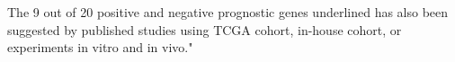 \documentclass[preprint,12pt]{elsarticle}
\newenvironment{MyColorPar}[1]{%
    \leavevmode\color{#1}\ignorespaces%
}{%
}%
\begin{document}
\begin{MyColorPar}{blue}

The 9 out of 20 positive and negative prognostic genes underlined has also been suggested by published studies using TCGA cohort, in-house cohort, or experiments in vitro and in vivo."


\pagebreak









\end{MyColorPar}








%

\end{document}
